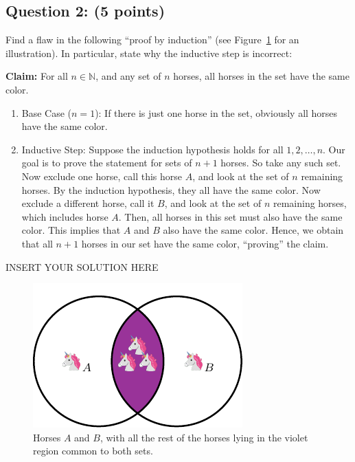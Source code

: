 \subsection*{Question 2: (5 points)}
Find a flaw in the following ``proof by induction'' (see Figure~\ref{fig:horse} for an illustration). In particular, state why the inductive step is incorrect:
\vspace{0.5cm}

\noindent \textbf{Claim:} For all $n \in \mathbb{N}$, and any set of $n$ horses, all horses in the set have the same color.

\begin{enumerate}
    \item Base Case ($n=1$): If there is just one horse in the set, obviously all horses have the same color.
    \item Inductive Step: Suppose the induction hypothesis holds for all $1,2,\ldots,n$. Our goal is to prove the statement for sets of $n+1$ horses. So take any such set. Now exclude one horse, call this horse $A$, and look at the set of $n$ remaining horses. By the induction hypothesis, they all have the same color. Now exclude a different horse, call it $B$, and look at the set of $n$ remaining horses, which includes horse $A$. Then, all horses in this set must also have the same color. This implies that $A$ and $B$ also have the same color. Hence, we obtain that all $n+1$ horses in our set have the same color, ``proving'' the claim. 
\end{enumerate}

\begin{solution}   INSERT YOUR SOLUTION HERE   \end{solution}


\begin{figure}[h]
    \centering
    \includegraphics{images/horse_venn.pdf}
    \caption{Horses $A$ and $B$, with all the rest of the horses lying in the violet region common to both sets.}
    \label{fig:horse}
\end{figure}




